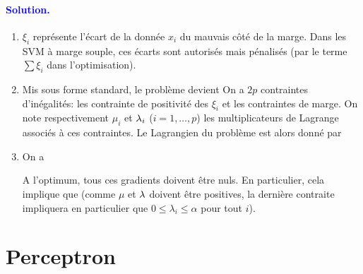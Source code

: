\paragraph{\textcolor{blue}{Solution.}}
\begin{enumerate}
	\item $\xi_i$ représente l'écart de la donnée $x_i$ du mauvais côté de la marge. Dans les SVM à marge souple, ces écarts sont autorisés mais pénalisés (par le terme $\sum \xi_i$ dans l'optimisation).
	\item Mis sous forme standard, le problème devient
On a $2p$ contraintes d'inégalités: les contrainte de positivité des $\xi_i$ et les contraintes de marge. On note respectivement $\mu_i$ et $\lambda_i$ ($i=1,\ldots,p$) les multiplicateurs de Lagrange associés à ces contraintes. Le Lagrangien du problème est alors donné par
	
	\item On a
	
	A l'optimum, tous ces gradients doivent être nuls. En particulier, cela implique que
	(comme $\mu$ et $\lambda$ doivent être positives, la dernière contraite impliquera en particulier que $0 \leq \lambda_i \leq \alpha$ pour tout $i$).
\end{enumerate}

\section{Perceptron}

